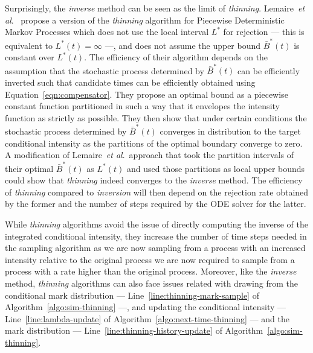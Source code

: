 \documentclass{juliacon}
\numberwithin{equation}{section}
\newcommand{\etal}{\textit{et al}.}
\begin{document}
Surprisingly, the \textit{inverse} method can be seen as the limit of \textit{thinning}. Lemaire~\etal~\cite{lemaire2018} propose a version of the \textit{thinning} algorithm for Piecewise Deterministic Markov Processes which does not use the local interval \( L^\ast \) for rejection --- this is equivalent to \( L^\ast(t) = \infty \) ---, and does not assume the upper bound \( \bar{B}^\ast(t) \) is constant over \( L^\ast(t) \). The efficiency of their algorithm depends on the assumption that the stochastic process determined by \( \bar{B}^\ast(t) \) can be efficiently inverted such that candidate times can be efficiently obtained using Equation~\ref{eqn:compensator}. They propose an optimal bound as a piecewise constant function partitioned in such a way that it envelopes the intensity function as strictly as possible. They then show that under certain conditions the stochastic process determined by \( \bar{B}^\ast(t) \) converges in distribution to the target conditional intensity as the partitions of the optimal boundary converge to zero. A modification of Lemaire~\etal~approach that took the partition intervals of their optimal \( \bar{B}^\ast(t) \) as \( L^\ast(t) \) and used those partitions as local upper bounds could show that \textit{thinning} indeed converges to the \textit{inverse} method. The efficiency of \textit{thinning} compared to \textit{inversion} will then depend on the rejection rate obtained by the former and the number of steps required by the ODE solver for the latter.

While \textit{thinning} algorithms avoid the issue of directly computing the inverse of the integrated conditional intensity, they increase the number of time steps needed in the sampling algorithm as we are now sampling from a process with an increased intensity relative to the original process we are now required to sample from a process with a rate higher than the original process. Moreover, like the \textit{inverse} method, \textit{thinning} algorithms can also face issues related with drawing from the conditional mark distribution --- Line~\ref{line:thinning-mark-sample} of Algorithm~\ref{algo:sim-thinning} ---, and updating the conditional intensity --- Line~\ref{line:lambda-update} of Algorithm~\ref{algo:next-time-thinning} --- and the mark distribution --- Line~\ref{line:thinning-history-update} of Algorithm~\ref{algo:sim-thinning}.
\end{document}
